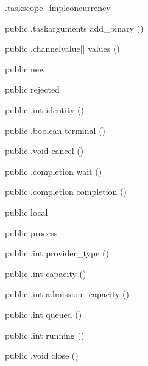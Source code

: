 \begin{CrexxClass}{.taskscope\_impl}{concurrency}
\begin{Members}
    \Method
      {public}
      {.taskarguments}
      {add\_binary}
      {()}

    \Method
      {public}
      {.channelvalue[]}
      {values}
      {()}

    \Factory
      {public}
      {new}
      {}

    \Factory
      {public}
      {rejected}
      {}

    \Method
      {public}
      {.int}
      {identity}
      {()}

    \Method
      {public}
      {.boolean}
      {terminal}
      {()}

    \Method
      {public}
      {.void}
      {cancel}
      {()}

    \Method
      {public}
      {.completion}
      {wait}
      {()}

    \Method
      {public}
      {.completion}
      {completion}
      {()}

    \Factory
      {public}
      {local}
      {}

    \Factory
      {public}
      {process}
      {}

    \Method
      {public}
      {.int}
      {provider\_type}
      {()}

    \Method
      {public}
      {.int}
      {capacity}
      {()}

    \Method
      {public}
      {.int}
      {admission\_capacity}
      {()}

    \Method
      {public}
      {.int}
      {queued}
      {()}

    \Method
      {public}
      {.int}
      {running}
      {()}

    \Method
      {public}
      {.void}
      {close}
      {()}


\end{Members}
\end{CrexxClass}
